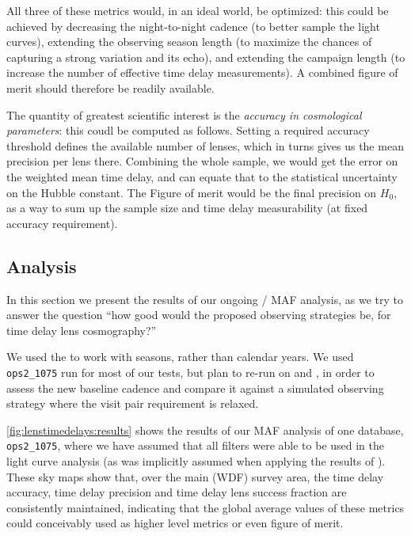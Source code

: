 All three of these metrics would, in an ideal world, be optimized:
this could be achieved by decreasing the night-to-night cadence (to
better sample the light curves), extending the observing season length
(to maximize the chances of capturing a strong variation and its
echo), and extending the campaign length (to increase the number of
effective time delay measurements). A combined figure of merit should
therefore be readily available.

The quantity of greatest scientific interest is the {\it accuracy in
cosmological parameters}: this coudl be computed as follows. Setting a
required accuracy threshold  defines the available number of lenses,
which in turns gives us the mean precision per lens there. Combining the
whole sample, we would get the error on the weighted mean time delay,
and can equate that to the statistical uncertainty on the Hubble
constant. The Figure of merit would be the final precision on $H_0$, as
a way to sum up the sample size and time delay measurability (at fixed
accuracy requirement).


\subsection{\OpSim Analysis}
\label{sec:\secname:analysis}


In this section we present the results of our ongoing \OpSim / MAF
analysis, as we try to
answer the question ``how good would the proposed observing
strategies be, for time delay lens cosmography?''

We used the
 to work
with seasons, rather than calendar years.
We used \texttt{ops2\_1075} \OpSim run for most of our tests, but plan
to re-run on  and
, in order to assess the new baseline
cadence and compare it against a simulated observing strategy where
the visit pair requirement is relaxed.


\autoref{fig:lenstimedelays:results} shows the results of our MAF
analysis of one \OpSim database, \texttt{ops2\_1075}, where we have
assumed that all filters were able to be used in the light curve
analysis (as was implicitly assumed when applying the results of
\citeauthor{LiaoEtal2015}). These sky maps show that, over the main
(WDF) survey area, the time delay accuracy, time delay precision and
time delay lens success fraction are consistently maintained,
indicating that the global average values of these metrics could
conceivably used as higher level metrics or even figure of merit.

